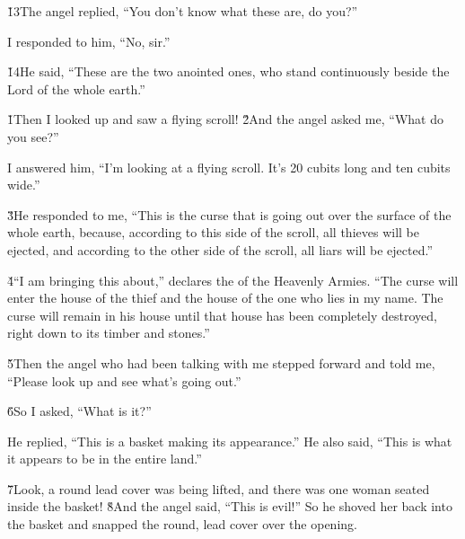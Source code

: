 \v{13}The angel replied, ``You don't know what these are, do you?''

I responded to him, ``No, sir.''

\v{14}He said, ``These are the two anointed ones, who stand continuously beside the Lord of the whole earth.''

\v{1}Then I looked up and saw a flying scroll! \v{2}And the angel asked me, ``What do you see?''

I answered him, ``I'm looking at a flying scroll. It's 20 cubits long and ten cubits wide.''

\v{3}He responded to me, ``This is the curse that is going out over the surface of the whole earth, because, according to this side of the scroll, all thieves will be ejected, and according to the other side of the scroll, all liars will be ejected.''

\v{4}``I am bringing this about,'' declares the  of the Heavenly Armies. ``The curse will enter the house of the thief and the house of the one who lies in my name. The curse will remain in his house until that house has been completely destroyed, right down to its timber and stones.''

\v{5}Then the angel who had been talking with me stepped forward and told me, ``Please look up and see what's going out.''

\v{6}So I asked, ``What is it?''

He replied, ``This is a basket making its appearance.'' He also said, ``This is what it appears to be in the entire land.''

\v{7}Look, a round lead cover was being lifted, and there was one woman seated inside the basket! \v{8}And the angel said, ``This is evil!'' So he shoved her back into the basket and snapped the round, lead cover over the opening.

